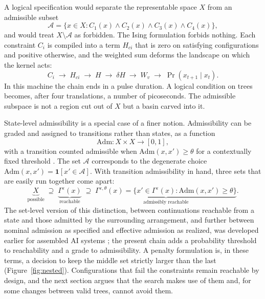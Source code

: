 \documentclass[11pt]{article}
\theoremstyle{definition}
\theoremstyle{remark}
\newcommand{\A}{\mathcal{A}}
\begin{document}
A logical specification would separate the representable space $X$ from an admissible subset
\begin{equation}
\A = \{ x \in X : C_1(x) \wedge C_2(x) \wedge C_3(x) \wedge C_4(x) \},
\end{equation}
and would treat $X \setminus \A$ as forbidden. The Ising formulation forbids nothing. Each constraint $C_i$ is compiled into a term $H_{ci}$ that is zero on satisfying configurations and positive otherwise, and the weighted sum deforms the landscape on which the kernel acts:
\begin{equation}
C_i \;\longrightarrow\; H_{ci} \;\longrightarrow\; H \;\longrightarrow\; \delta H \;\longrightarrow\; W_v \;\longrightarrow\; \Pr(x_{t+1} \mid x_t).
\end{equation}
In this machine the chain ends in a pulse duration. A logical condition on trees becomes, after four translations, a number of picoseconds. The admissible subspace is not a region cut out of $X$ but a basin carved into it.

State-level admissibility is a special case of a finer notion. Admissibility can be graded and assigned to transitions rather than states, as a function
\begin{equation}
\mathrm{Adm} : X \times X \to [0,1],
\end{equation}
with a transition counted admissible when $\mathrm{Adm}(x, x') \geq \theta$ for a contextually fixed threshold \cite{flyxion-clipboard}. The set $\A$ corresponds to the degenerate choice $\mathrm{Adm}(x, x') = \mathbf{1}[x' \in \A]$. With transition admissibility in hand, three sets that are easily run together come apart:
\begin{equation}
\underbrace{X}_{\text{possible}} \;\supseteq\; \underbrace{\Gamma^{\varepsilon}(x)}_{\text{reachable}} \;\supseteq\; \underbrace{\Gamma^{\varepsilon,\theta}(x) = \{x' \in \Gamma^{\varepsilon}(x) : \mathrm{Adm}(x,x') \geq \theta\}}_{\text{admissibly reachable}} .
\end{equation}
The set-level version of this distinction, between continuations reachable from a state and those admitted by the surrounding arrangement, and further between nominal admission as specified and effective admission as realized, was developed earlier for assembled AI systems \cite{flyxion-arranged}; the present chain adds a probability threshold to reachability and a grade to admissibility. A penalty formulation is, in these terms, a decision to keep the middle set strictly larger than the last (Figure~\ref{fig:nested}). Configurations that fail the constraints remain reachable by design, and the next section argues that the search makes use of them and, for some changes between valid trees, cannot avoid them.
\end{document}
